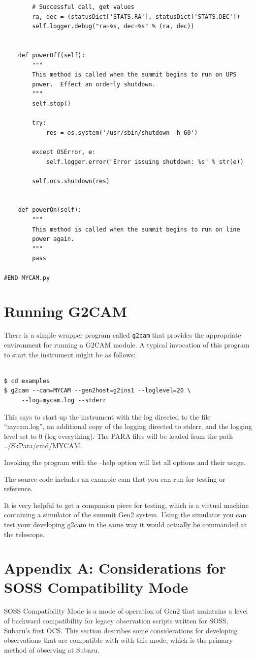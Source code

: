 \documentclass[11pt]{report}
\begin{document}
\begin{verbatim}
        # Successful call, get values
        ra, dec = (statusDict['STATS.RA'], statusDict['STATS.DEC'])
        self.logger.debug("ra=%s, dec=%s" % (ra, dec))


    def powerOff(self):
        """
        This method is called when the summit begins to run on UPS
        power.  Effect an orderly shutdown.
        """
        self.stop()

        try:
            res = os.system('/usr/sbin/shutdown -h 60')

        except OSError, e:
            self.logger.error("Error issuing shutdown: %s" % str(e))

        self.ocs.shutdown(res)


    def powerOn(self):
        """
        This method is called when the summit begins to run on line
        power again.
        """
        pass
    
#END MYCAM.py
\end{verbatim}

\chapter{Running G2CAM}
\label{ch:running}
There is a simple wrapper program called {\tt g2cam} that provides the
appropriate environment for running a G2CAM module. A typical invocation
of this program to start the instrument might be as follows: 
\begin{verbatim}

$ cd examples
$ g2cam --cam=MYCAM --gen2host=g2ins1 --loglevel=20 \
     --log=mycam.log --stderr 

\end{verbatim}
This says to start up the instrument with the log directed to the file
``mycam.log'', an additional copy of the logging directed to stderr, and
the logging level set to 0 (log everything). The PARA files will be
loaded from the path ../SkPara/cmd/MYCAM. 

Invoking the program with the --help option will list all options and
their usage. 

The source code includes an example cam that you can run for testing or
reference.

It is very helpful to get a companion piece for testing, which is a
virtual machine containing a simulator of the summit Gen2 system.  Using
the simulator you can test your developing g2cam in the same way it
would actually be commanded at the telescope.

\chapter{Appendix A: Considerations for SOSS Compatibility Mode}
SOSS Compatibility Mode is a mode of operation of Gen2 that maintains a
level of backward compatibility for legacy observation scripts written
for SOSS, Subaru's first OCS. This section describes some considerations
for developing observations that are compatible with with this mode,
which is the primary method of observing at Subaru. 
\end{document}
